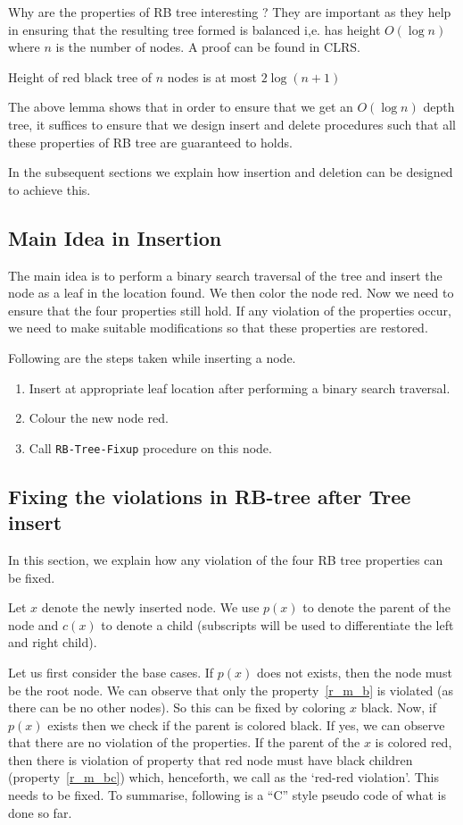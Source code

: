\documentclass[10pt]{article}
\begin{document}
Why are the properties of RB tree interesting ? They are important as they
help in ensuring that the resulting tree formed is balanced i,e. has height
$O(\log n)$ where $n$ is the number of nodes. A proof can be found in CLRS.
\begin{lemma}
Height of red black tree of $n$ nodes is at most $2\log (n+1)$
\end{lemma}

The above lemma shows that in order to ensure that we get an $O(\log n)$ depth
tree, it suffices to ensure that we design insert and delete procedures such
that all these properties of RB tree are guaranteed to holds.

In the subsequent sections we explain how insertion and deletion can be
designed to achieve this.

\subsection{Main Idea in Insertion}
The main idea is to perform a binary search traversal of the tree and insert
the node as a leaf in the location found. We then color the node red. Now we
need to ensure that the four properties still hold. If any violation of the
properties occur, we need to make suitable modifications so that these
properties are restored.

Following are the steps taken while inserting a node.
\begin{enumerate}
\item Insert at appropriate leaf location after performing a binary search
traversal.
\item Colour the new node red.
\item Call {\tt RB-Tree-Fixup} procedure on this node.
\end{enumerate}

\subsection{Fixing the violations in RB-tree after Tree insert}
In this section, we explain how any violation of the four RB tree properties
 can be fixed.

Let $x$ denote the newly inserted node. We use $p(x)$ to denote
the parent of the node and $c(x)$ to denote a child (subscripts will be
used to differentiate the left and right child). 

Let us first consider the base cases. If $p(x)$ does not exists, then
the node must be the root node. We can observe that only the
property~\ref{r_m_b} is violated (as there can be no other nodes). So this can
be fixed by coloring $x$ black. Now, if $p(x)$ exists then we check if the
parent is colored black. If yes, we can observe that there are no violation
of the properties. If the parent of the $x$ is colored red, then there is
violation of property that red node must have black children 
(property~\ref{r_m_bc}) which, henceforth, we call as the `red-red
violation'. This needs to be fixed. To summarise, following is a ``C'' style
pseudo code of what is done so far.
\end{document}
